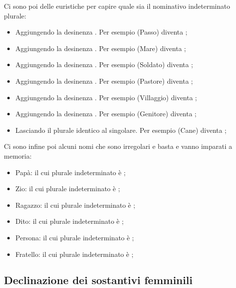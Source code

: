 Ci sono poi delle euristiche per capire quale sia il nominativo indeterminato plurale:

\begin{itemize}
    \item Aggiungendo la desinenza . Per esempio (Passo)  diventa ;
    \item Aggiungendo la desinenza . Per esempio (Mare)  diventa ;
    \item Aggiungendo la desinenza . Per esempio (Soldato)  diventa ;
    \item Aggiungendo la desinenza . Per esempio (Pastore)  diventa ;
    \item Aggiungendo la desinenza . Per esempio (Villaggio)  diventa ;
    \item Aggiungendo la desinenza . Per esempio (Genitore)  diventa ;
    \item Lasciando il plurale identico al singolare. Per esempio (Cane)  diventa ;
\end{itemize}

Ci sono infine poi alcuni nomi che sono irregolari e basta e vanno imparati a memoria:

\begin{itemize}
    \item Papà:  il cui plurale indeterminato è ;
    \item Zio:  il cui plurale indeterminato è ;
    \item Ragazzo:  il cui plurale indeterminato è ;
    \item Dito:  il cui plurale indeterminato è ;
    \item Persona:  il cui plurale indeterminato è ;
    \item Fratello:  il cui plurale indeterminato è ;
\end{itemize}


\subsection{Declinazione dei sostantivi femminili}

